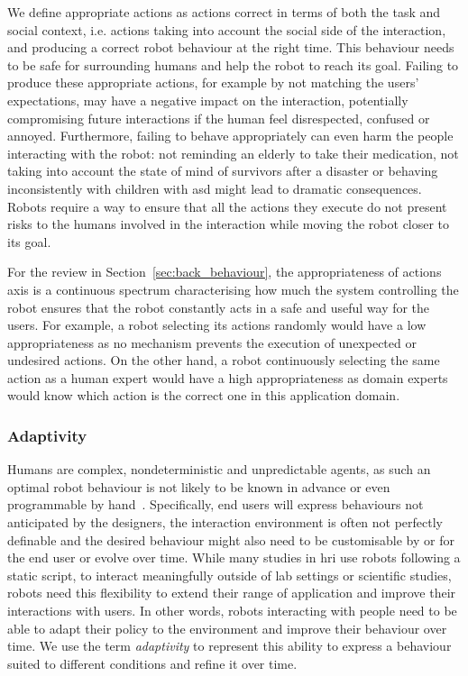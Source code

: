 We define appropriate actions as actions correct in terms of both the task and social context, i.e. actions taking into account the social side of the interaction, and producing a correct robot behaviour at the right time. This behaviour needs to be safe for surrounding humans and help the robot to reach its goal. Failing to produce these appropriate actions, for example by not matching the users' expectations, may have a negative impact on the interaction, potentially compromising future interactions if the human feel disrespected, confused or annoyed. Furthermore, failing to behave appropriately can even harm the people interacting with the robot: not reminding an elderly to take their medication, not taking into account the state of mind of survivors after a disaster or behaving inconsistently with children with \gls{asd} might lead to dramatic consequences. Robots require a way to ensure that all the actions they execute do not present risks to the humans involved in the interaction while moving the robot closer to its goal.

For the review in Section~\ref{sec:back_behaviour}, the appropriateness of actions axis is a continuous spectrum characterising how much the system controlling the robot ensures that the robot constantly acts in a safe and useful way for the users. For example, a robot selecting its actions randomly would have a low appropriateness as no mechanism prevents the execution of unexpected or undesired actions. On the other hand, a robot continuously selecting the same action as a human expert would have a high appropriateness as domain experts would know which action is the correct one in this application domain.

\subsubsection{Adaptivity}	\label{ssec:adap}

Humans are complex, nondeterministic and unpredictable agents, as such an optimal robot behaviour is not likely to be known in advance or even programmable by hand~\citep{dautenhahn2004robots,argall2009survey}. Specifically, end users will express behaviours not anticipated by the designers, the interaction environment is often not perfectly definable and the desired behaviour might also need to be customisable by or for the end user or evolve over time. While many studies in \gls{hri} use robots following a static script, to interact meaningfully outside of lab settings or scientific studies, robots need this flexibility to extend their range of application and improve their interactions with users. In other words, robots interacting with people need to be able to adapt their policy to the environment and improve their behaviour over time. We use the term \emph{adaptivity} to represent this ability to express a behaviour suited to different conditions and refine it over time. 

